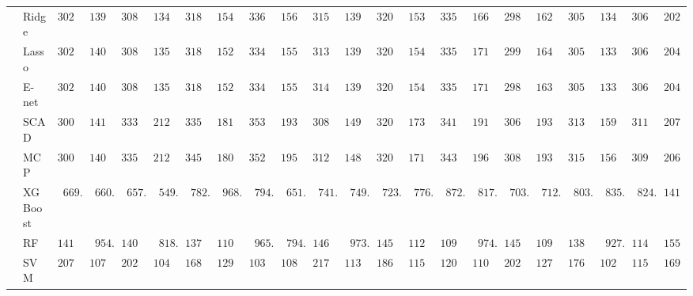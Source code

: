\begin{tabular}{ll|ll|llllll|llllll|llllll}
 & Ridge  & $3024.74$ & $1396.41$ & $3081.78$ & $1349.80$ & $3189.77$ & $1547.37$ & $3367.64$ & $1560.59$ & $3150.50$ & $1390.92$ & $3204.82$ & $1537.10$ & $3358.96$ & $1664.95$ & $2984.83$ & $1620.44$ & $3051.09$ & $1342.73$ & $3065.59$ & $2025.65$ \\
 & Lasso  & $3020.04$ & $1402.02$ & $3083.70$ & $1351.14$ & $3185.17$ & $1520.39$ & $3348.09$ & $1556.13$ & $3139.22$ & $1391.06$ & $3209.15$ & $1547.39$ & $3352.05$ & $1719.77$ & $2990.72$ & $1642.48$ & $3052.12$ & $1339.77$ & $3061.42$ & $2046.11$ \\
 & E-net  & $3020.38$ & $1401.55$ & $3083.59$ & $1350.98$ & $3186.40$ & $1526.71$ & $3346.17$ & $1553.01$ & $3140.15$ & $1390.47$ & $3207.61$ & $1544.02$ & $3350.89$ & $1713.66$ & $2989.50$ & $1637.55$ & $3052.69$ & $1339.98$ & $3061.47$ & $2044.23$ \\
 & SCAD  & $3008.60$ & $1419.50$ & $3336.62$ & $2121.56$ & $3356.30$ & $1813.53$ & $3531.73$ & $1939.65$ & $3088.41$ & $1491.17$ & $3209.68$ & $1736.18$ & $3412.80$ & $1916.87$ & $3068.85$ & $1937.80$ & $3139.39$ & $1596.98$ & $3111.24$ & $2070.88$ \\
 & MCP  & $3006.58$ & $1409.95$ & $3356.26$ & $2125.56$ & $3457.17$ & $1809.90$ & $3521.21$ & $1956.99$ & $3128.34$ & $1482.91$ & $3201.48$ & $1716.84$ & $3436.23$ & $1965.21$ & $3085.66$ & $1936.54$ & $3152.14$ & $1564.80$ & $3096.02$ & $2065.46$ \\
 & XGBoost  & $\phantom{0}669.76$ & $\phantom{0}660.72$ & $\phantom{0}657.71$ & $\phantom{0}549.66$ & $\phantom{0}782.09$ & $\phantom{0}968.31$ & $\phantom{0}794.54$ & $\phantom{0}651.13$ & $\phantom{0}741.10$ & $\phantom{0}749.05$ & $\phantom{0}723.97$ & $\phantom{0}776.08$ & $\phantom{0}872.37$ & $\phantom{0}817.07$ & $\phantom{0}703.90$ & $\phantom{0}712.53$ & $\phantom{0}803.31$ & $\phantom{0}835.82$ & $\phantom{0}824.42$ & $1410.27$ \\
 & RF  & $1417.71$ & $\phantom{0}954.68$ & $1409.67$ & $\phantom{0}818.83$ & $1373.20$ & $1105.85$ & $\phantom{0}965.65$ & $\phantom{0}794.34$ & $1463.75$ & $\phantom{0}973.83$ & $1451.43$ & $1123.72$ & $1099.23$ & $\phantom{0}974.36$ & $1454.33$ & $1093.27$ & $1386.90$ & $\phantom{0}927.00$ & $1141.59$ & $1556.76$ \\
 & SVM  & $2073.77$ & $1075.82$ & $2029.33$ & $1045.37$ & $1686.63$ & $1297.79$ & $1030.44$ & $1088.13$ & $2170.74$ & $1133.48$ & $1865.53$ & $1152.00$ & $1200.73$ & $1108.62$ & $2025.37$ & $1270.25$ & $1760.98$ & $1023.32$ & $1157.63$ & $1691.99$ \\
\hline 
\end{tabular}

